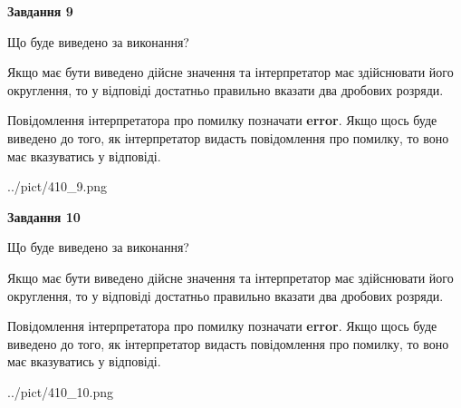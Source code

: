 \documentclass[12pt, ukrainian]{article}
\begin{document}
{\begin {Large}
{\begin {center}\textbf{Завдання 9}\end {center}}\par
Що буде виведено за виконання? \par

Якщо має бути виведено дійсне значення та інтерпретатор має здійснювати його округлення, 
то у відповіді достатньо правильно вказати два дробових розряди.

Повідомлення інтерпретатора про помилку позначати \textbf{error}.
Якщо щось буде виведено до того, як інтерпретатор видасть повідомлення про помилку, 
то воно має вказуватись у відповіді. \par

\begin{center}
	{../pict/410_9.png}
\end{center}
\newpage

{\begin {center}\textbf{Завдання 10}\end {center}}\par
Що буде виведено за виконання? \par

Якщо має бути виведено дійсне значення та інтерпретатор має здійснювати його округлення, 
то у відповіді достатньо правильно вказати два дробових розряди.

Повідомлення інтерпретатора про помилку позначати \textbf{error}.
Якщо щось буде виведено до того, як інтерпретатор видасть повідомлення про помилку, 
то воно має вказуватись у відповіді. \par

\begin{center}
	{../pict/410_10.png}
\end{center}
\newpage

\end {Large}}
\end{document}
